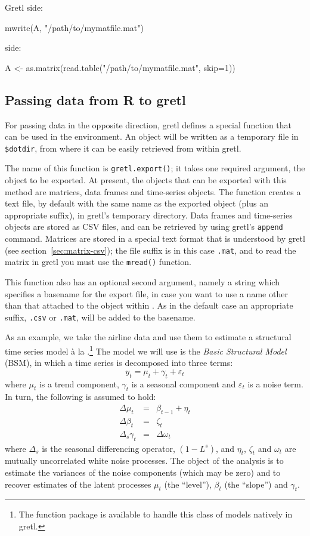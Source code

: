 Gretl side:
\begin{code}
  mwrite(A, "/path/to/mymatfile.mat")
\end{code}
 side:
\begin{code}
  A <- as.matrix(read.table("/path/to/mymatfile.mat", skip=1))
\end{code}

\subsection{Passing data from R to gretl}
\label{sec:Rpassing-data}

For passing data in the opposite direction, gretl defines a special
function that can be used in the  environment. An 
object will be written as a temporary file in
\verb|$dotdir|, from where it can be easily retrieved from within
gretl.

The name of this function is \texttt{gretl.export()}; it takes one
required argument, the object to be exported. At present, the objects
that can be exported with this method are matrices, data frames and
time-series objects. The function creates a text file, by default with
the same name as the exported object (plus an appropriate suffix),
in gretl's temporary directory. Data frames and time-series objects
are stored as CSV files, and can be retrieved by using gretl's
\texttt{append} command.  Matrices are stored in a special text format
that is understood by gretl (see section~\ref{sec:matrix-csv}); the
file suffix is in this case \texttt{.mat}, and to read the matrix in
gretl you must use the \texttt{mread()} function.

This function also has an optional second argument, namely a string
which specifies a basename for the export file, in case you want to
use a name other than that attached to the object within . As
in the default case an appropriate suffix, \texttt{.csv} or
\texttt{.mat}, will be added to the basename.

As an example, we take the airline data and use them to estimate a
structural time series model \`a la \cite{harvey89}.\footnote{The
  function package  is available to handle this
  class of models natively in gretl.} The model we will use is
the \emph{Basic Structural Model} (BSM), in which a time series is
decomposed into three terms:
\[
  y_t = \mu_t + \gamma_t + \varepsilon_t
\]
where $\mu_t$ is a trend component, $\gamma_t$ is a seasonal component
and $\varepsilon_t$ is a noise term. In turn, the following is assumed
to hold:
\begin{eqnarray*}
  \Delta \mu_t & = & \beta_{t-1} + \eta_t \\
  \Delta \beta_t & = & \zeta_t \\
  \Delta_s \gamma_t & = & \Delta \omega_t
\end{eqnarray*}
where $\Delta_s$ is the seasonal differencing operator, $(1-L^s)$, and
$\eta_t$, $\zeta_t$ and $\omega_t$ are mutually uncorrelated white
noise processes. The object of the analysis is to estimate the
variances of the noise components (which may be zero) and to recover
estimates of the latent processes $\mu_t$ (the ``level''), $\beta_t$
(the ``slope'') and $\gamma_t$.

